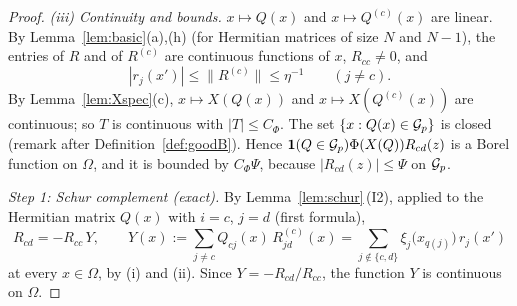 \begin{proof}
\emph{\textup{(iii)} Continuity and bounds.} $x\mapsto Q(x)$ and $x\mapsto Q^{(c)}(x)$ are linear. By Lemma~\ref{lem:basic}(a),(h) (for Hermitian matrices of size $N$ and $N-1$), the entries of $R$ and of $R^{(c)}$
are continuous functions of $x$, $R_{cc}\ne0$, and
\begin{equation}\label{eq:b3:rbound}
|r_j(x')|\le\|R^{(c)}\|\le\eta^{-1}\qquad(j\ne c).
\end{equation}
By Lemma~\ref{lem:Xspec}(c), $x\mapsto X(Q(x))$ and $x\mapsto X(Q^{(c)}(x))$ are continuous; so $T$ is continuous with $|T|\le C_\Phi$. The set $\{x:Q(x)\in\mathcal{G}_p\}$ is closed (remark after Definition~\ref{def:goodB}).
Hence $\mathbf 1(Q\in\mathcal{G}_p)\Phi(X(Q))R_{cd}(z)$ is a Borel function on $\Omega$, and it is bounded by $C_\Phi\Psi$, because $|R_{cd}(z)|\le\Psi$ on $\mathcal{G}_p$.

\smallskip\noindent\emph{Step 1: Schur complement (exact).} By Lemma~\ref{lem:schur}\,\textup{(I2)}, applied to the Hermitian matrix $Q(x)$ with $i=c$, $j=d$ (first formula),
\begin{equation}\label{eq:b3:schur}
R_{cd}=-R_{cc}\,Y,\qquad Y(x):=\sum_{j\ne c}Q_{cj}(x)\,R^{(c)}_{jd}(x)=\sum_{j\notin\{c,d\}}\xi_j\big(x_{q(j)}\big)\,r_j(x')
\end{equation}
at every $x\in\Omega$, by (i) and (ii). Since $Y=-R_{cd}/R_{cc}$, the function $Y$ is continuous on $\Omega$.


\end{proof}
